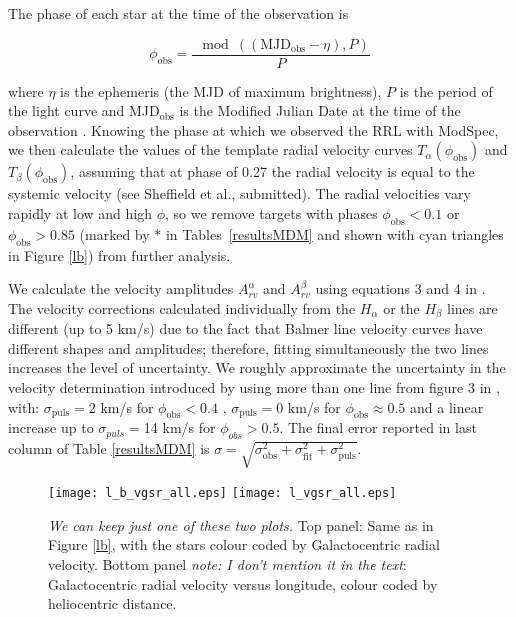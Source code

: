\documentclass[useAMS,usenatbib]{mn2e}
\begin{document}
The phase of each star at the time of the observation is 

\begin{equation}
\phi_{\mathrm{obs}} = \frac{\mod((\mathrm{MJD}_{\mathrm{obs}} - \eta),P)}{P}
\end{equation}

where $\eta$ is the ephemeris (the MJD of maximum brightness), $P$ is the period of the light curve and MJD$_{\mathrm{obs}}$ is the Modified Julian Date at the time of the observation \citep{Drake2013a}. Knowing the phase at which we observed the RRL with ModSpec, we then calculate the values of the template radial velocity curves $T_{\alpha}(\phi_{\mathrm{obs}})$ and $T_{\beta}(\phi_{\mathrm{obs}})$, assuming that at phase of 0.27 the radial velocity is equal to the systemic velocity (see Sheffield et al., submitted). The radial velocities vary rapidly at low and high $\phi$, so we remove targets with phases $\phi_{\mathrm{obs}}<0.1$ or $\phi_{\mathrm{obs}}>0.85$ (marked by * in Tables~\ref{resultsMDM} and shown with cyan triangles in Figure \ref{lb}) from further analysis. 

We calculate the velocity amplitudes $A^{\alpha}_{rv}$ and  $A^{\beta}_{rv}$ using equations 3 and 4 in \citet{Se12}. The velocity corrections calculated individually from the $H_{\alpha}$ or the $H_{\beta}$ lines are different (up to 5 km/s) due to the fact that Balmer line velocity curves have different shapes and amplitudes; therefore, fitting simultaneously the two lines increases the level of uncertainty. We roughly approximate the uncertainty in the velocity determination introduced by using more than one line from figure 3 in \citet{Se12}, with: $\sigma_{\mathrm{puls}} = 2$ km/s for $\phi_{\mathrm{obs}}<0.4$ ,  $\sigma_{\mathrm{puls}} = 0$ km/s for $\phi_{\mathrm{obs}}\approx 0.5$ and a linear increase up to $\sigma_{puls}=$14 km/s for $\phi_{obs}>0.5$. 
The final error reported in last column of Table \ref{resultsMDM} is $\sigma = \sqrt{\sigma_{\mathrm{obs}}^{2} + \sigma_{\mathrm{fit}}^{2}+\sigma_{\mathrm{puls}}^{2}}$. 

\begin{figure}
\hspace{-0.5cm}
\texttt{[image: l\_b\_vgsr\_all.eps]}
\texttt{[image: l\_vgsr\_all.eps]}
\caption{\textit{We can keep just one of these two plots.} Top panel: Same as in Figure \ref{lb}, with the stars colour coded by Galactocentric radial velocity. Bottom panel \textit{note: I don't mention it in the text}: Galactocentric radial velocity versus longitude, colour coded by heliocentric distance. }
\label{lbvgsr}
\end{figure}
\end{document}
